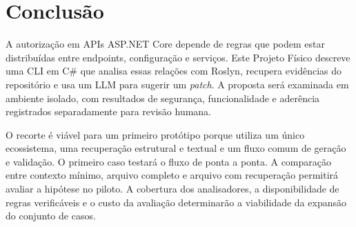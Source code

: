 \chapter{Conclusão}
\label{cap:conclusao}

A autorização em APIs ASP.NET Core depende de regras que podem estar distribuídas entre endpoints, configuração e serviços. Este Projeto Físico descreve uma CLI em C\# que analisa essas relações com Roslyn, recupera evidências do repositório e usa um LLM para sugerir um \textit{patch}. A proposta será examinada em ambiente isolado, com resultados de segurança, funcionalidade e aderência registrados separadamente para revisão humana.

O recorte é viável para um primeiro protótipo porque utiliza um único ecossistema, uma recuperação estrutural e textual e um fluxo comum de geração e validação. O primeiro caso testará o fluxo de ponta a ponta. A comparação entre contexto mínimo, arquivo completo e arquivo com recuperação permitirá avaliar a hipótese no piloto. A cobertura dos analisadores, a disponibilidade de regras verificáveis e o custo da avaliação determinarão a viabilidade da expansão do conjunto de casos.
